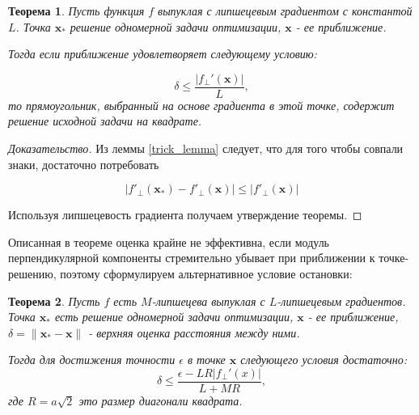 \documentclass[12pt]{article}
\newtheorem{theorem}{Теорема}[section]
\begin{document}
\begin{theorem}
\label{CurGrad}
Пусть функция $f$ выпуклая с липшецевым градиентом с константой $L$. Точка $\textbf{x}_*$ решение одномерной задачи оптимизации, $\textbf{x}$ - ее приближение.

Тогда если приближение удовлетворяет следующему условию:

$$\delta \leq \frac{|f_\perp'(\textbf{x})|}{L},$$
то прямоугольник, выбранный на основе градиента в этой точке, содержит решение исходной задачи на квадрате. 
\end{theorem}
\begin{proof}[Доказательство]

Из леммы \ref{trick_lemma} следует, что для того чтобы совпали знаки, достаточно потребовать

$$\left|f'_\perp(\textbf{x}_*) - f'_\perp(\textbf{x})\right| \leq |f'_\perp(\textbf{x})|$$

Используя липшецевость градиента получаем утверждение теоремы.
\end{proof}

Описанная в теореме оценка крайне не эффективна, если модуль перпендикулярной компоненты стремительно убывает при приближении к точке-решению, поэтому сформулируем альтернативное условие остановки:

\begin{theorem}
\label{small}
Пусть $f$ есть $M$-липшецева выпуклая с $L$-липшецевым градиентов. Точка $\textbf{x}_*$ есть решение одномерной задачи оптимизации, $\textbf{x}$ - ее приближение, $\delta = \|\textbf{x}_*-\textbf{x}\|$ - верхняя оценка расстояния между ними.

Тогда для достижения точности $\epsilon$ в точке $\textbf{x}$ следующего условия достаточно:
$$\delta \leq \frac{\epsilon-LR|f_\perp'(x)|}{L+MR}, $$
где $R=a\sqrt{2}$ это размер диагонали квадрата.
\end{theorem}
\end{document}
